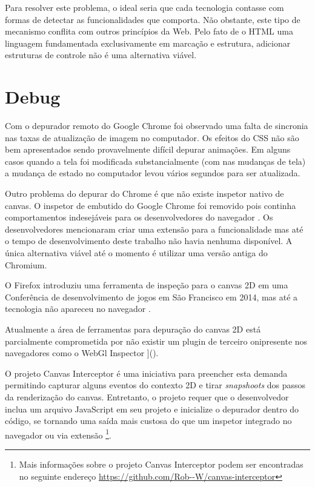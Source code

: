Para resolver este problema, o ideal seria que cada tecnologia contasse
com formas de detectar as funcionalidades que comporta. Não obstante,
este tipo de mecanismo conflita com outros princípios da Web.
Pelo fato de o HTML uma linguagem fundamentada exclusivamente em marcação e estrutura, adicionar
estruturas de controle não é uma alternativa viável.

\section{Debug}

Com o depurador remoto do Google Chrome foi observado uma falta de
sincronia nas taxas de atualização de imagem no computador. Os
efeitos do CSS não são bem apresentados sendo provavelmente difícil
depurar animações. Em alguns casos quando a tela foi modificada
substancialmente (com nas mudanças de tela) a mudança de estado no
computador levou vários segundos para ser atualizada.

Outro problema do depurar do Chrome é que não existe inspetor nativo
de canvas. O inspetor de embutido do Google Chrome foi removido pois
continha comportamentos indesejáveis para os desenvolvedores do
navegador \autocite{canvasinspector}. Os desenvolvedores mencionaram
criar uma extensão para a funcionalidade mas até o tempo de
desenvolvimento deste trabalho não havia nenhuma disponível. A única
alternativa viável até o momento é utilizar uma versão antiga do
Chromium.

O Firefox introduziu uma ferramenta de inspeção para o canvas 2D
em uma Conferência de desenvolvimento de jogos em São Francisco em 2014,
mas até a tecnologia não apareceu no navegador \autocite{firefoxCanvasDebug}.

Atualmente a área de ferramentas para depuração do canvas 2D está
parcialmente comprometida por não existir um plugin de terceiro
onipresente nos navegadores como o WebGl Inspector ]().

O projeto Canvas Interceptor é uma iniciativa para preencher
esta demanda permitindo capturar alguns eventos do contexto 2D e
tirar \textit{snapshoots} dos passos da renderização do canvas.
Entretanto, o projeto requer que o desenvolvedor inclua um arquivo
JavaScript em seu projeto e inicialize o depurador dentro do código,
se tornando uma saída mais custosa do que um inspetor integrado
no navegador ou via extensão \footnote{Mais informações sobre o
projeto Canvas Interceptor podem ser encontradas no seguinte endereço
\url{https://github.com/Rob--W/canvas-interceptor}}.


